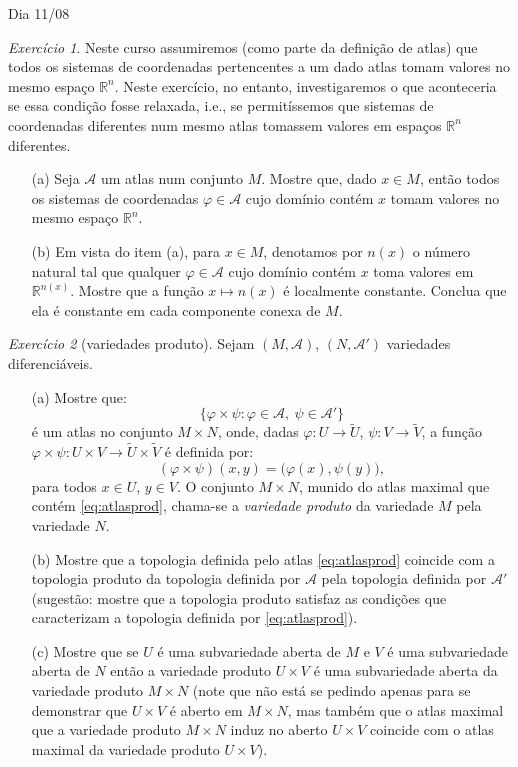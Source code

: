 \documentclass[oneside,11pt]{amsart}
\newcommand{\R}{\mathds R}
\theoremstyle{remark}\newtheorem{exercise}{Exercício}[section]
\theoremstyle{plain}\newtheorem{teo}{Teorema}[section]
\theoremstyle{plain}\newtheorem{lem}[teo]{Lema}
\theoremstyle{plain}\newtheorem{prop}[teo]{Proposição}
\theoremstyle{definition}\newtheorem{defin}[teo]{Definição}
\theoremstyle{remark}\newtheorem{rem}[teo]{Observação}
\theoremstyle{definition}\newtheorem{example}[teo]{Exemplo}
\numberwithin{equation}{section}
\begin{document}
\begin{section}{Dia 11/08}
\begin{exercise}
Neste curso assumiremos (como parte da definição de atlas) que todos os sistemas de coordenadas pertencentes a um dado atlas tomam valores no mesmo
espaço $\R^n$. Neste exercício, no entanto, investigaremos o que aconteceria se essa condição fosse relaxada, i.e., se permitíssemos que sistemas de coordenadas
diferentes num mesmo atlas tomassem valores em espaços $\R^n$ diferentes.
\begin{itemize}
\item[(a)] Seja $\mathcal A$ um atlas num conjunto $M$. Mostre que, dado $x\in M$, então todos os sistemas de coordenadas $\varphi\in\mathcal A$
cujo domínio contém $x$ tomam valores no mesmo espaço $\R^n$.
\item[(b)] Em vista do item (a), para $x\in M$, denotamos por $n(x)$ o número natural tal que qualquer $\varphi\in\mathcal A$ cujo domínio contém $x$
toma valores em $\R^{n(x)}$. Mostre que a função $x\mapsto n(x)$ é localmente constante. Conclua que ela é constante em cada componente conexa de $M$.
\end{itemize}
\end{exercise}

\begin{exercise}[variedades produto]
Sejam $(M,\mathcal A)$, $(N,\mathcal A')$ variedades diferenciáveis.
\begin{itemize}
\item[(a)] Mostre que:
\begin{equation}\label{eq:atlasprod}
\big\{\varphi\times\psi:\varphi\in\mathcal A,\ \psi\in\mathcal A'\big\}
\end{equation}
é um atlas no conjunto $M\times N$, onde, dadas $\varphi:U\to\widetilde U$, $\psi:V\to\widetilde V$, a função
$\varphi\times\psi:U\times V\to\widetilde U\times\widetilde V$ é definida por:
\[(\varphi\times\psi)(x,y)=\big(\varphi(x),\psi(y)\big),\]
para todos $x\in U$, $y\in V$. O conjunto $M\times N$, munido do atlas maximal que contém \eqref{eq:atlasprod}, chama-se a {\em variedade produto\/}
da variedade $M$ pela variedade $N$.
\item[(b)] Mostre que a topologia definida pelo atlas \eqref{eq:atlasprod} coincide com a topologia produto da topologia
definida por $\mathcal A$ pela topologia definida por $\mathcal A'$ (sugestão: mostre que a topologia produto satisfaz as condições que caracterizam
a topologia definida por \eqref{eq:atlasprod}).
\item[(c)] Mostre que se $U$ é uma subvariedade aberta de $M$ e $V$ é uma subvariedade aberta de $N$ então a variedade produto $U\times V$ é uma subvariedade
aberta da variedade produto $M\times N$ (note que não está se pedindo apenas para se demonstrar que $U\times V$ é aberto
em $M\times N$, mas também que o atlas maximal
que a variedade produto $M\times N$ induz no aberto $U\times V$ coincide com o atlas maximal da variedade produto
$U\times V$).
\end{itemize}
\end{exercise}


\end{section}
\end{document}
